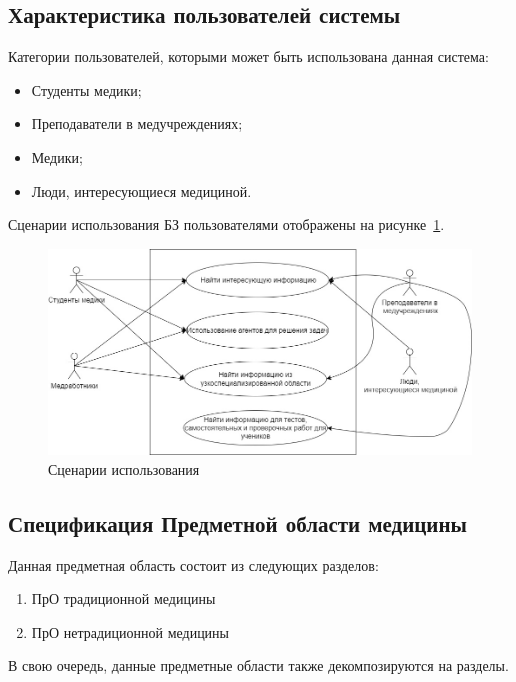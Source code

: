\subsection{Характеристика пользователей системы}
Категории пользователей, которыми может быть использована данная система:
\begin{itemize}
	\item Студенты медики;
	\item Преподаватели в медучреждениях;
	\item Медики;
	\item Люди, интересующиеся медициной.
\end{itemize}
Сценарии использования БЗ пользователями отображены на рисунке~\ref{fig:sections/users}.
\begin{figure}[H]
	\centering
	\includegraphics[width=1.0\textwidth]{sections/users.jpeg}
	\caption{Сценарии использования}
	\label{fig:sections/users}
\end{figure}

\subsection{Спецификация Предметной области  медицины}
Данная предметная область состоит из следующих разделов:
\begin{enumerate}
	\item ПрО традиционной медицины
	\item ПрО нетрадиционной медицины\\
\end{enumerate}

В свою очередь, данные предметные области также декомпозируются на разделы.

